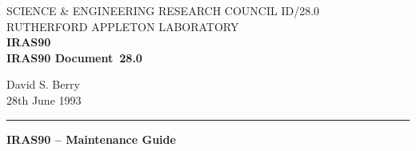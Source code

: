 \pagestyle{myheadings}

\newcommand{\stardoccategory}  {IRAS90 Document}
\newcommand{\stardocinitials}  {ID}
\newcommand{\stardocnumber}    {28.0}
\newcommand{\stardocauthors}   {David S. Berry}
\newcommand{\stardocdate}      {28th June 1993}
\newcommand{\stardoctitle}     {IRAS90 -- Maintenance Guide}

\newcommand{\stardocname}{\stardocinitials /\stardocnumber}
\renewcommand{\_}{{\tt\char'137}}     %
\markright{\stardocname}
\setlength{\textwidth}{160mm}
\setlength{\textheight}{230mm}
\setlength{\topmargin}{-2mm}
\setlength{\oddsidemargin}{0mm}
\setlength{\evensidemargin}{0mm}
\setlength{\parindent}{0mm}
\setlength{\parskip}{\medskipamount}
\setlength{\unitlength}{1mm}
\setlength{\unitlength}{1mm}


\newcommand{\dgs}{\hbox{$^\circ$}}
\newcommand{\lsk}{\raisebox{-0.4ex}{\rm *}}
\newcommand{\menuitem}[2]
  {{\bf #1}: \addtolength{\baselineskip}{-0.4ex}
  \parbox[t]{128mm}{#2} \addtolength{\baselineskip}{0.4ex} \\ \hspace{-5pt}}
\newenvironment{refs}{\goodbreak
                      \vspace{3ex}
                      \begin{list}{}{\setlength{\topsep}{0mm}
                                     \setlength{\partopsep}{0mm}
                                     \setlength{\itemsep}{0mm}
                                     \setlength{\parsep}{0mm}
                                     \setlength{\leftmargin}{1.5em}
                                     \setlength{\itemindent}{-\leftmargin}
                                     \setlength{\labelsep}{0mm}
                                     \setlength{\labelwidth}{0mm}}
                    }{\end{list}}


\thispagestyle{empty}
SCIENCE \& ENGINEERING RESEARCH COUNCIL \hfill \stardocname\\
RUTHERFORD APPLETON LABORATORY\\
{\large\bf IRAS90\\}
{\large\bf \stardoccategory\ \stardocnumber}
\begin{flushright}
\stardocauthors\\
\stardocdate
\end{flushright}
\vspace{-4mm}
\rule{\textwidth}{0.5mm}
\vspace{5mm}
\begin{center}
{\Large\bf \stardoctitle}
\end{center}
\vspace{5mm}

